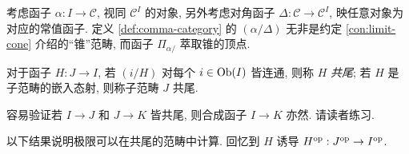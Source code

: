 \begin{example}\label{eg:comma-vs-cone}
	考虑函子 $\alpha: I \to \mathcal{C}$, 视同 $\mathcal{C}^I$ 的对象, 另外考虑对角函子 $\Delta: \mathcal{C} \to \mathcal{C}^I$, 映任意对象为对应的常值函子. 定义 \ref{def:comma-category} 的 $(\alpha/\Delta)$ 无非是约定 \ref{con:limit-cone} 介绍的``锥''范畴, 而函子 $\Pi_{\alpha/}$ 萃取锥的顶点.
\end{example}

\begin{definition}\label{def:cofinal} 
	对于函子 $H: J \to I$, 若 $(i/H)$ 对每个 $i \in \operatorname{Ob}(I)$ 皆连通, 则称 $H$ \emph{共尾}; 若 $H$ 是子范畴的嵌入态射, 则称子范畴 $J$ 共尾.
\end{definition}

容易验证若 $I \to J$ 和 $J \to K$ 皆共尾, 则合成函子 $I \to K$ 亦然. 请读者练习.

以下结果说明极限可以在共尾的范畴中计算. 回忆到 $H$ 诱导 $H^{\operatorname{op}}: J^{\operatorname{op}} \to I^{\operatorname{op}}$.

